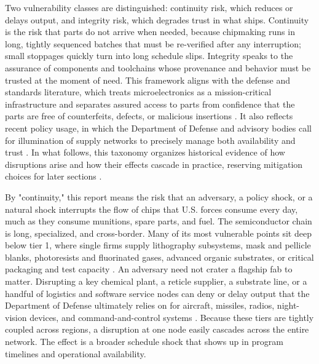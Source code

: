 Two vulnerability classes are distinguished: continuity risk, which reduces or delays output, and integrity risk, which degrades trust in what ships. Continuity is the risk that parts do not arrive when needed, because chipmaking runs in long, tightly sequenced batches that must be re-verified after any interruption; small stoppages quickly turn into long schedule slips. Integrity speaks to the assurance of components and toolchains whose provenance and behavior must be trusted at the moment of need. This framework aligns with the defense and standards literature, which treats microelectronics as a mission-critical infrastructure and separates assured access to parts from confidence that the parts are free of counterfeits, defects, or malicious insertions \parencite{defense_science_board_report_2005,kahn_semiconductors_2023}. It also reflects recent policy usage, in which the Department of Defense and advisory bodies call for illumination of supply networks to precisely manage both availability and trust \parencite{ch5_dod2022_supplychains,defense_science_board_report_2005}. In what follows, this taxonomy organizes historical evidence of how disruptions arise and how their effects cascade in practice, reserving mitigation choices for later sections \parencite{wasser_when_2022}.

By "continuity," this report means the risk that an adversary, a policy shock, or a natural shock interrupts the flow of chips that U.S. forces consume every day, much as they consume munitions, spare parts, and fuel. The semiconductor chain is long, specialized, and cross-border. Many of its most vulnerable points sit deep below tier 1, where single firms supply lithography subsystems, mask and pellicle blanks, photoresists and fluorinated gases, advanced organic substrates, or critical packaging and test capacity \parencite{varas_strengthening_2021,thadani_mapping_2023}. An adversary need not crater a flagship fab to matter. Disrupting a key chemical plant, a reticle supplier, a substrate line, or a handful of logistics and software service nodes can deny or delay output that the Department of Defense ultimately relies on for aircraft, missiles, radios, night-vision devices, and command-and-control systems \parencite{wasser_when_2022,usdoe_office_of_energy_efficiency_and_renewable_energy_eere_semiconductor_2022}. Because these tiers are tightly coupled across regions, a disruption at one node easily cascades across the entire network. The effect is a broader schedule shock that shows up in program timelines and operational availability.

